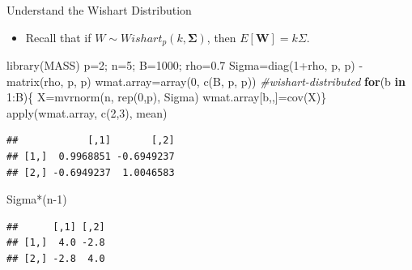 \documentclass[
  ignorenonframetext,
]{beamer}
\newenvironment{Shaded}{\begin{snugshade}}{\end{snugshade}}
\newcommand{\CommentTok}[1]{\textcolor[rgb]{0.56,0.35,0.01}{\textit{#1}}}
\newcommand{\ControlFlowTok}[1]{\textcolor[rgb]{0.13,0.29,0.53}{\textbf{#1}}}
\newcommand{\DecValTok}[1]{\textcolor[rgb]{0.00,0.00,0.81}{#1}}
\newcommand{\FloatTok}[1]{\textcolor[rgb]{0.00,0.00,0.81}{#1}}
\newcommand{\FunctionTok}[1]{\textcolor[rgb]{0.00,0.00,0.00}{#1}}
\newcommand{\NormalTok}[1]{#1}
\newcommand{\OtherTok}[1]{\textcolor[rgb]{0.56,0.35,0.01}{#1}}
\newcommand{\SpecialCharTok}[1]{\textcolor[rgb]{0.00,0.00,0.00}{#1}}
\providecommand{\tightlist}{%
  \setlength{\itemsep}{0pt}\setlength{\parskip}{0pt}}
\begin{document}
\begin{frame}[fragile]{Understand the Wishart Distribution}
\protect\hypertarget{understand-the-wishart-distribution}{}
\begin{itemize}
\tightlist
\item
  Recall that if \(W\sim Wishart_p(k, \boldsymbol \Sigma)\), then
  \(E[\mathbf W]=k\Sigma\).
\end{itemize}

\tiny

\begin{Shaded}
\begin{Highlighting}[]
\FunctionTok{library}\NormalTok{(MASS)}
\NormalTok{p}\OtherTok{=}\DecValTok{2}\NormalTok{; n}\OtherTok{=}\DecValTok{5}\NormalTok{; B}\OtherTok{=}\DecValTok{1000}\NormalTok{; rho}\OtherTok{=}\FloatTok{0.7}
\NormalTok{Sigma}\OtherTok{=}\FunctionTok{diag}\NormalTok{(}\DecValTok{1}\SpecialCharTok{+}\NormalTok{rho, p, p) }\SpecialCharTok{{-}} \FunctionTok{matrix}\NormalTok{(rho, p, p)}
\NormalTok{wmat.array}\OtherTok{=}\FunctionTok{array}\NormalTok{(}\DecValTok{0}\NormalTok{, }\FunctionTok{c}\NormalTok{(B, p, p)) }\CommentTok{\#wishart{-}distributed}
\ControlFlowTok{for}\NormalTok{(b }\ControlFlowTok{in} \DecValTok{1}\SpecialCharTok{:}\NormalTok{B)\{}
\NormalTok{  X}\OtherTok{=}\FunctionTok{mvrnorm}\NormalTok{(n, }\FunctionTok{rep}\NormalTok{(}\DecValTok{0}\NormalTok{,p), Sigma)}
\NormalTok{  wmat.array[b,,]}\OtherTok{=}\FunctionTok{cov}\NormalTok{(X)\}}
\FunctionTok{apply}\NormalTok{(wmat.array, }\FunctionTok{c}\NormalTok{(}\DecValTok{2}\NormalTok{,}\DecValTok{3}\NormalTok{), mean)}
\end{Highlighting}
\end{Shaded}

\begin{verbatim}
##            [,1]       [,2]
## [1,]  0.9968851 -0.6949237
## [2,] -0.6949237  1.0046583
\end{verbatim}

\begin{Shaded}
\begin{Highlighting}[]
\NormalTok{Sigma}\SpecialCharTok{*}\NormalTok{(n}\DecValTok{{-}1}\NormalTok{)}
\end{Highlighting}
\end{Shaded}

\begin{verbatim}
##      [,1] [,2]
## [1,]  4.0 -2.8
## [2,] -2.8  4.0
\end{verbatim}

\normalsize
\end{frame}
\end{document}
